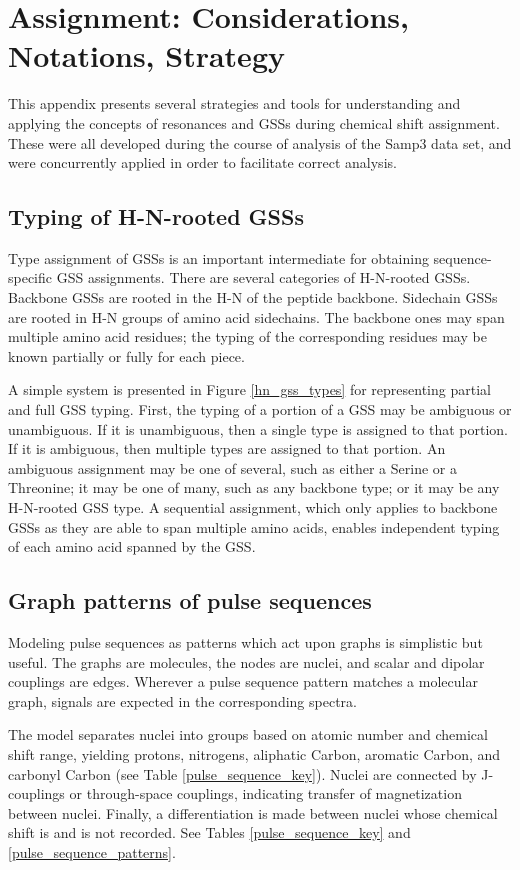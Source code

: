 \chapter{Assignment: Considerations, Notations, Strategy}
This appendix presents several strategies and tools for understanding and 
applying the concepts of resonances and GSSs during chemical shift assignment.
These were all developed during the course of analysis of the Samp3 data set,
and were concurrently applied in order to facilitate correct analysis.


\section{Typing of H-N-rooted GSSs}
Type assignment of GSSs is an important intermediate for obtaining 
sequence-specific GSS assignments.  There are several categories of H-N-rooted
GSSs.  Backbone GSSs are rooted in the H-N of the peptide backbone.  Sidechain 
GSSs are rooted in H-N groups of amino acid sidechains.
The backbone ones may span multiple amino acid residues; the typing of the 
corresponding residues may be known partially or fully for each piece.

A simple system is presented in Figure \ref{hn_gss_types} for representing 
partial and full GSS typing.  First, the typing of a portion of a GSS may be 
ambiguous or unambiguous.  If it is unambiguous, then a single type is assigned
to that portion.  If it is ambiguous, then multiple types are assigned to that
portion.  An ambiguous assignment may be one of several, such as either a
Serine or a Threonine; it may be one of many, such as any backbone type; or
it may be any H-N-rooted GSS type.  A sequential assignment, which only applies
to backbone GSSs as they are able to span multiple amino acids, enables 
independent typing of each amino acid spanned by the GSS.


\section{Graph patterns of pulse sequences}
Modeling pulse sequences as patterns which act upon graphs is simplistic but
useful.  The graphs are molecules, the nodes are nuclei, and scalar and
dipolar couplings are edges.  Wherever a pulse sequence pattern matches 
a molecular graph, signals are expected in the corresponding spectra.

The model separates nuclei into groups based on atomic number
and chemical shift range, yielding protons, nitrogens, aliphatic Carbon,
aromatic Carbon, and carbonyl Carbon (see Table \ref{pulse_sequence_key}).
Nuclei are connected by J-couplings or through-space couplings, 
indicating transfer of magnetization between nuclei.
Finally, a differentiation is made between nuclei whose chemical shift is 
and is not recorded.  See Tables \ref{pulse_sequence_key} and 
\ref{pulse_sequence_patterns}.

